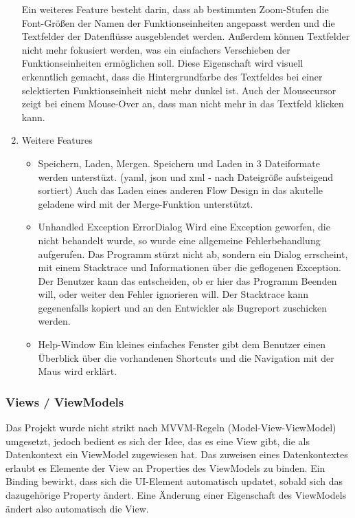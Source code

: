 \begin{enumerate}
	Ein weiteres Feature besteht darin, dass ab bestimmten Zoom-Stufen die
	Font-Größen der Namen der Funktionseinheiten angepasst werden und die 
	Textfelder der Datenflüsse ausgeblendet werden.
	Außerdem können Textfelder nicht mehr fokusiert werden, was ein einfachers
	Verschieben der Funktionseinheiten ermöglichen soll. Diese Eigenschaft wird
	visuell erkenntlich gemacht, dass die Hintergrundfarbe des Textfeldes bei
	einer selektierten Funktionseinheit nicht mehr dunkel ist.
	Auch der Mousecursor zeigt bei einem Mouse-Over an, dass man nicht mehr in
	das Textfeld klicken kann.
	
	
	\item Weitere Features
	\label{sec:orgheadline21}
	\begin{itemize}
		\item Speichern, Laden, Mergen.
		Speichern und Laden in 3 Dateiformate werden unterstüzt.
		(yaml, json und xml - nach Dateigröße aufsteigend sortiert)
		Auch das Laden eines anderen Flow Design in das akutelle geladene wird 
		mit der Merge-Funktion unterstützt.
	\end{itemize}
	
	
	\begin{itemize}
		\item Unhandled Exception ErrorDialog
		Wird eine Exception geworfen, die nicht behandelt wurde, so wurde eine
		allgemeine Fehlerbehandlung aufgerufen. Das Programm stürzt nicht ab,
		sondern ein Dialog errscheint, mit einem Stacktrace und Informationen
		über die geflogenen Exception. Der Benutzer kann das entscheiden, ob er
		hier das Programm Beenden will, oder weiter den Fehler ignorieren will.
		Der Stacktrace kann gegenenfalls kopiert und an den Entwickler als
		Bugreport zuschicken werden.
	\end{itemize}
	
	
	\begin{itemize}
		\item Help-Window
		Ein kleines einfaches Fenster gibt dem Benutzer einen Überblick über die
		vorhandenen Shortcuts und die Navigation mit der Maus wird erklärt.
	\end{itemize}
\end{enumerate}




\subsubsection{Views / ViewModels}
\label{sec:orgheadline23}
Das Projekt wurde nicht strikt nach MVVM-Regeln (Model-View-ViewModel) 
umgesetzt, jedoch bedient es sich der Idee, das es eine View gibt, die
als Datenkontext ein ViewModel zugewiesen hat. Das zuweisen eines
Datenkontextes erlaubt es Elemente der View an Properties des ViewModels zu
binden. Ein Binding bewirkt, dass sich die UI-Element automatisch updatet,
sobald sich das dazugehörige Property ändert. Eine Änderung einer
Eigenschaft des ViewModels ändert also automatisch die View.

